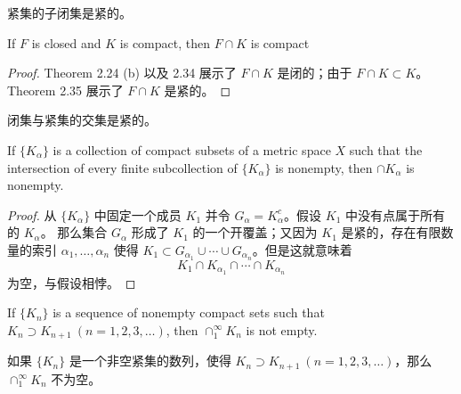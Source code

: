 \documentclass[../poma-notes.tex]{subfiles}
\begin{document}
\anote 紧集的子闭集是紧的。

\begin{corollary}
  If $F$ is closed and $K$ is compact, then $F \cap K$ is compact
\end{corollary}

\begin{proof}
  Theorem 2.24 (b) 以及 2.34 展示了 $F \cap K$ 是闭的；由于 $F \cap K \subset K$。Theorem 2.35 展示了 $F \cap K$ 是紧的。
\end{proof}

\anote 闭集与紧集的交集是紧的。

\begin{theorem}
  If $\{K_{\alpha}\}$ is a collection of compact subsets of a metric space $X$ such that the intersection of every finite
  subcollection of $\{K_{\alpha}\}$ is nonempty, then $\cap K_{\alpha}$ is nonempty.
\end{theorem}

\begin{proof}
  从 $\{K_{\alpha}\}$ 中固定一个成员 $K_1$ 并令 $G_{\alpha} = K_{\alpha}^c$。假设 $K_1$ 中没有点属于所有的 $K_{\alpha}$。
  那么集合 $G_{\alpha}$ 形成了 $K_1$ 的一个开覆盖；又因为 $K_1$ 是紧的，存在有限数量的索引 $\alpha_1,\dots,\alpha_n$ 使得
  $K_1 \subset G_{\alpha_1} \cup \cdots \cup G_{\alpha_n}$。但是这就意味着
  \[K_1 \cap K_{\alpha_1} \cap \cdots \cap K_{\alpha_n}\]
  为空，与假设相悖。
\end{proof}

\begin{corollary}
  If $\{K_n\}$ is a sequence of nonempty compact sets such that $K_n \supset K_{n+1} \ (n=1,2,3,\dots)$, then
  $\cap_1^{\infty} K_n$ is not empty.
\end{corollary}

\anote
如果 $\{K_n\}$ 是一个非空紧集的数列，使得 $K_n \supset K_{n+1} \ (n=1,2,3,\dots)$，那么 $\cap_1^{\infty} K_n$ 不为空。
\end{document}
